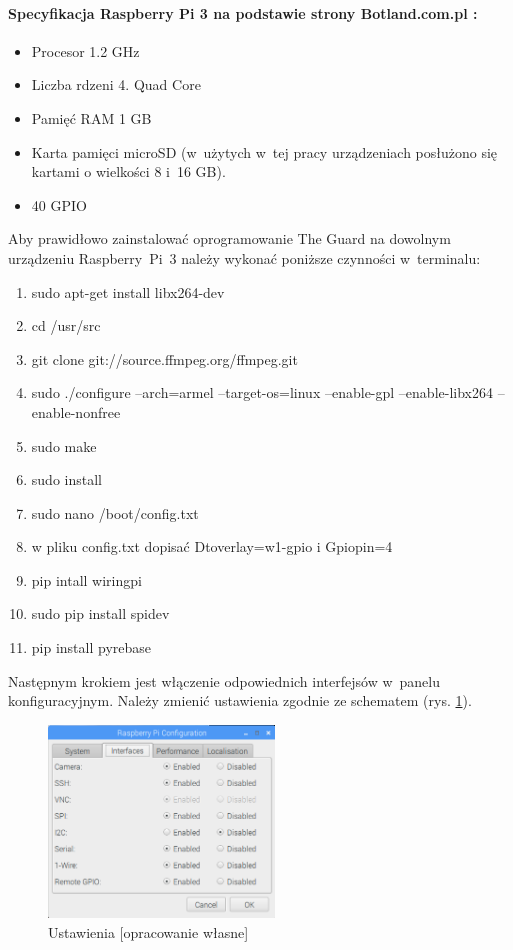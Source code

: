 \paragraph{Specyfikacja Raspberry Pi 3 na podstawie strony Botland.com.pl \cite{specyfikacja_rasp}:}
\begin{itemize} 
\item Procesor 1.2 GHz
\item Liczba rdzeni 4. Quad Core
\item Pamięć RAM 1 GB
\item Karta pamięci microSD (w~użytych w~tej pracy urządzeniach posłużono się kartami o wielkości 8 i~16 GB).
\item 40 GPIO
\end{itemize}
Aby prawidłowo zainstalować oprogramowanie The Guard na dowolnym urządzeniu Raspberry~Pi~3 należy wykonać poniższe czynności w~terminalu:
\begin{enumerate} 
\item sudo apt-get install libx264-dev
\item cd /usr/src
\item git clone git://source.ffmpeg.org/ffmpeg.git
\item sudo ./configure --arch=armel --target-os=linux --enable-gpl --enable-libx264 --enable-nonfree
\item sudo make
\item sudo install
\item sudo nano /boot/config.txt
\item w pliku config.txt dopisać Dtoverlay=w1-gpio i Gpiopin=4
\item pip intall wiringpi
\item sudo pip install spidev
\item pip install pyrebase
\end{enumerate}
Następnym krokiem jest włączenie odpowiednich interfejsów w~panelu konfiguracyjnym. Należy zmienić ustawienia zgodnie ze schematem (rys. \ref{rs_settings}).
\begin{figure}[H]
	\centering
	\includegraphics[width=6cm]{RSettings}
	\caption{Ustawienia [opracowanie własne]}
	\label{rs_settings}
\end{figure}

